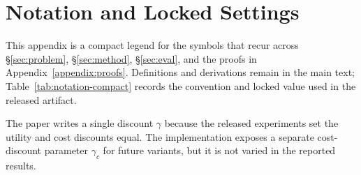 \section{Notation and Locked Settings}
\label{appendix:notation}

This appendix is a compact legend for the symbols that recur across
\S\ref{sec:problem}, \S\ref{sec:method}, \S\ref{sec:eval}, and the proofs in
Appendix~\ref{appendix:proofs}. Definitions and derivations remain in the main
text; Table~\ref{tab:notation-compact} records the convention and locked value
used in the released artifact.

The paper writes a single discount $\gamma$ because the released experiments set
the utility and cost discounts equal. The implementation exposes a separate
cost-discount parameter $\gamma_c$ for future variants, but it is not varied in
the reported results.

